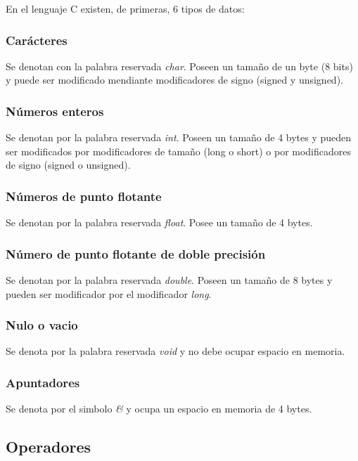 \documentclass[12pt]{article}
\begin{document}
En el lenguaje C existen, de primeras, 6 tipos de datos:

\subsubsection{Car\'acteres}

Se denotan con la palabra reservada \textit{char}. Poseen un tama\~no de un byte (8 bits) y puede ser modificado mendiante modificadores de signo (signed y unsigned).

\subsubsection{N\'umeros enteros}

Se denotan por la palabra reservada \textit{int}. Poseen un tama\~no de 4 bytes y pueden ser modificados por modificadores de tamaño (long o short) o por modificadores de signo (signed o unsigned). 

\subsubsection{N\'umeros de punto flotante}

Se denotan por la palabra reservada \textit{float}. Posee un tama\~no de 4 bytes.

\subsubsection{N\'umero de punto flotante de doble precisi\'on}

Se denotan por la palabra reservada \textit{double}. Poseen un tama\~no de 8 bytes y pueden ser modificador por el modificador \textit{long}.

\subsubsection{Nulo o vacio}

Se denota por la palabra reservada \textit{void} y no debe ocupar espacio en memoria.

\subsubsection{Apuntadores}

Se denota por el simbolo \textit{\&} y ocupa un espacio en memoria de 4 bytes.

\subsection{Operadores}
\end{document}
